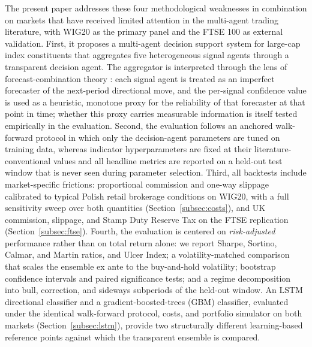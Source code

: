 \documentclass{ieeeaccess}
\begin{document}
The present paper addresses these four methodological weaknesses in combination on markets that have received limited attention in the multi-agent trading literature, with WIG20 as the primary panel and the FTSE 100 as external validation. First, it proposes a multi-agent decision support system for large-cap index constituents that aggregates five heterogeneous signal agents through a transparent decision agent. The aggregator is interpreted through the lens of forecast-combination theory \cite{batesgranger1969,clemen1989,timmermann2006}: each signal agent is treated as an imperfect forecaster of the next-period directional move, and the per-signal confidence value is used as a heuristic, monotone proxy for the reliability of that forecaster at that point in time; whether this proxy carries measurable information is itself tested empirically in the evaluation. Second, the evaluation follows an anchored walk-forward protocol in which only the decision-agent parameters are tuned on training data, whereas indicator hyperparameters are fixed at their literature-conventional values and all headline metrics are reported on a held-out test window that is never seen during parameter selection. Third, all backtests include market-specific frictions: proportional commission and one-way slippage calibrated to typical Polish retail brokerage conditions on WIG20, with a full sensitivity sweep over both quantities (Section~\ref{subsec:costs}), and UK commission, slippage, and Stamp Duty Reserve Tax on the FTSE replication (Section~\ref{subsec:ftse}). Fourth, the evaluation is centered on \emph{risk-adjusted} performance rather than on total return alone: we report Sharpe, Sortino, Calmar, and Martin ratios, and Ulcer Index; a volatility-matched comparison that scales the ensemble ex ante to the buy-and-hold volatility; bootstrap confidence intervals and paired significance tests; and a regime decomposition into bull, correction, and sideways subperiods of the held-out window. An LSTM directional classifier and a gradient-boosted-trees (GBM) classifier, evaluated under the identical walk-forward protocol, costs, and portfolio simulator on both markets (Section~\ref{subsec:lstm}), provide two structurally different learning-based reference points against which the transparent ensemble is compared.
\end{document}

